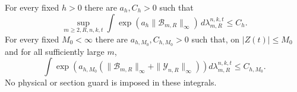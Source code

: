 \begin{theorem}
\label{thm:v53-exponential-maximal}
For every fixed $h>0$ there are $a_h,C_h>0$ such that
\begin{equation}\label{eq:v53-collision-exponential}
 \sup_{m\ge2,R,n,k,t}\int
     \exp(a_h\|\mathcal B_{m,R}\|_\infty)\,d\lambda_{m,R}^{n,k,t}
                                                           \le C_h.
\end{equation}
For every fixed $M_0<\infty$ there are $a_{h,M_0},C_{h,M_0}>0$
such that, on $|Z(t)|\le M_0$ and for all sufficiently large $m$,
\begin{equation}\label{eq:v53-return-exponential}
 \int\exp\!\left(a_{h,M_0}
       (\|\mathcal B_{m,R}\|_\infty+\|\mathcal Y_{n,R}\|_\infty)\right)
                                      d\lambda_{m,R}^{n,k,t}\le C_{h,M_0}.
\end{equation}
No physical or section guard is imposed in these integrals.
\end{theorem}
